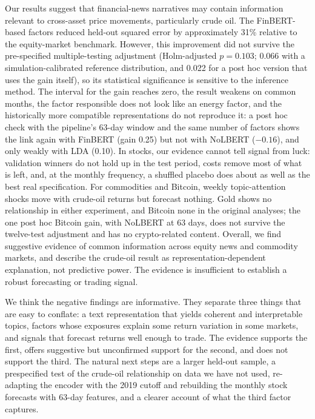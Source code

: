 \documentclass[11pt]{article}
\begin{document}
Our results suggest that financial-news narratives may contain information relevant to cross-asset price movements, particularly crude oil. The FinBERT-based factors reduced held-out squared error by approximately 31\% relative to the equity-market benchmark. However, this improvement did not survive the pre-specified multiple-testing adjustment (Holm-adjusted $p=0.103$; 0.066 with a simulation-calibrated reference distribution, and 0.022 for a post hoc version that uses the gain itself), so its statistical significance is sensitive to the inference method. The interval for the gain reaches zero, the result weakens on common months, the factor responsible does not look like an energy factor, and the historically more compatible representations do not reproduce it: a post hoc check with the pipeline's 63-day window and the same number of factors shows the link again with FinBERT (gain 0.25) but not with NoLBERT ($-0.16$), and only weakly with LDA (0.10). In stocks, our evidence cannot tell signal from luck: validation winners do not hold up in the test period, costs remove most of what is left, and, at the monthly frequency, a shuffled placebo does about as well as the best real specification. For commodities and Bitcoin, weekly topic-attention shocks move with crude-oil returns but forecast nothing. Gold shows no relationship in either experiment, and Bitcoin none in the original analyses; the one post hoc Bitcoin gain, with NoLBERT at 63 days, does not survive the twelve-test adjustment and has no crypto-related content. Overall, we find suggestive evidence of common information across equity news and commodity markets, and describe the crude-oil result as representation-dependent explanation, not predictive power. The evidence is insufficient to establish a robust forecasting or trading signal.

We think the negative findings are informative. They separate three things that are easy to conflate: a text representation that yields coherent and interpretable topics, factors whose exposures explain some return variation in some markets, and signals that forecast returns well enough to trade. The evidence supports the first, offers suggestive but unconfirmed support for the second, and does not support the third. The natural next steps are a larger held-out sample, a prespecified test of the crude-oil relationship on data we have not used, re-adapting the encoder with the 2019 cutoff and rebuilding the monthly stock forecasts with 63-day features, and a clearer account of what the third factor captures.
\end{document}
